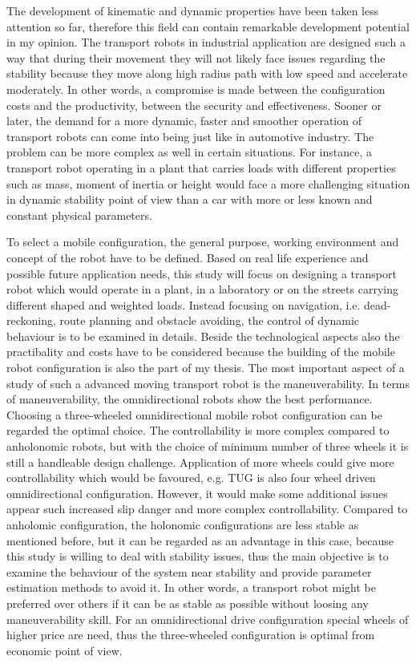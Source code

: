 \documentclass[12pt,english]{article}
\begin{document}
The development of kinematic and dynamic properties have been taken less attention so far, therefore this field can contain remarkable development potential in my opinion. The transport robots in industrial application are designed such a way that during their movement they will not likely face issues regarding the stability because they move along
high radius path with low speed and accelerate moderately. In other words, a compromise is made between the configuration costs and the productivity, between the security and effectiveness. Sooner or later, the demand for a more dynamic, faster and smoother operation of transport robots can come into being just like in automotive industry. The problem can be more complex as well in certain situations. For instance, a transport robot operating in a plant that carries loads with different properties such as mass, moment of inertia or height would face a more challenging situation in dynamic stability point of view than a car with more or less known and constant physical parameters.

To select a mobile configuration, the general purpose, working environment and concept of the robot have to be defined. Based on real life experience and possible future application needs, this study will focus on designing a transport robot which would operate in a plant, in a laboratory or on the streets carrying different shaped and weighted loads. Instead focusing on navigation, i.e. dead-reckoning, route planning and obstacle avoiding, the control of dynamic behaviour is to be examined in details. Beside the technological aspects also the practibality and costs have to be considered because the building of the mobile robot configuration is also the part of my thesis. The most important aspect of a study of such a advanced moving transport robot is the maneuverability. In terms of maneuverability, the omnidirectional robots show the best performance. Choosing a three-wheeled omnidirectional mobile robot configuration can be regarded the optimal choice. The controllability is more complex compared to anholonomic robots, but with the choice of minimum number of three wheels it is still a handleable design challenge. Application of more wheels could give more controllability which would be favoured, e.g. TUG is also four wheel driven omnidirectional configuration. However, it would make some additional issues appear such increased slip danger and more complex controllability. Compared to anholomic configuration, the holonomic configurations are less stable as mentioned before, but it can be regarded as an advantage in this case, because this study is willing to deal with stability issues, thus the main objective is to examine the behaviour of the system near stability and provide parameter estimation methods to avoid it.
In other words, a transport robot might be preferred over others if it can be as stable as possible without loosing any maneuverability skill. For an omnidirectional drive configuration special wheels of higher price are need, thus the three-wheeled configuration is optimal from economic point of view.
\end{document}
